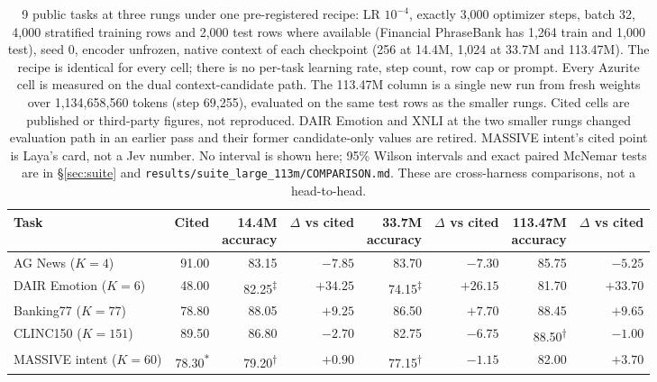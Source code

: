 \begin{table}[htbp]
\centering
\footnotesize
\caption{9 public tasks at three rungs under one pre-registered recipe:
LR $10^{-4}$, exactly 3{,}000 optimizer steps, batch 32, 4{,}000 stratified
training rows and 2{,}000 test rows where available (Financial PhraseBank has
1{,}264 train and 1{,}000 test), seed 0, encoder unfrozen, native context of
each checkpoint (256 at 14.4M, 1{,}024 at 33.7M and 113.47M). The recipe is
identical for every cell; there is no per-task learning rate, step count, row cap
or prompt. Every Azurite cell is measured on the dual context-candidate path. The
113.47M column is a single new run from fresh weights over 1{,}134{,}658{,}560
tokens (step 69{,}255), evaluated on the same test rows as the smaller rungs.
Cited cells are published or third-party figures, not reproduced. DAIR Emotion
and XNLI at the two smaller rungs changed evaluation path in an earlier pass and
their former candidate-only values are retired. MASSIVE intent's cited point is
Laya's card, not a Jev number. No interval is shown here; 95\% Wilson intervals
and exact paired McNemar tests are in \S\ref{sec:suite} and
\texttt{results/suite\_large\_113m/COMPARISON.md}. These are cross-harness
comparisons, not a head-to-head.}
\label{tab:suite}
\setlength{\tabcolsep}{2.5pt}
\begin{tabular}{@{}lrrrrrrr@{}}
\toprule
Task & Cited & \shortstack{14.4M\\accuracy} & \shortstack{$\Delta$ vs\\cited} &
\shortstack{33.7M\\accuracy} & \shortstack{$\Delta$ vs\\cited} &
\shortstack{113.47M\\accuracy} & \shortstack{$\Delta$ vs\\cited} \\
\midrule
AG News ($K=4$) & 91.00 & 83.15 & $-7.85$ & 83.70 & $-7.30$ & 85.75 & $-5.25$ \\
DAIR Emotion ($K=6$) & 48.00 & 82.25\textsuperscript{\(\ddagger\)} & \textbf{$+34.25$} & 74.15\textsuperscript{\(\ddagger\)} & \textbf{$+26.15$} & 81.70 & \textbf{$+33.70$} \\
Banking77 ($K=77$) & 78.80 & 88.05 & \textbf{$+9.25$} & 86.50 & \textbf{$+7.70$} & 88.45 & \textbf{$+9.65$} \\
CLINC150 ($K=151$) & 89.50 & 86.80 & $-2.70$ & 82.75 & $-6.75$ & 88.50\textsuperscript{\(\dagger\)} & $-1.00$ \\
MASSIVE intent ($K=60$) & 78.30\textsuperscript{\(\ast\)} & 79.20\textsuperscript{\(\dagger\)} & $+0.90$ & 77.15\textsuperscript{\(\dagger\)} & $-1.15$ & 82.00 & \textbf{$+3.70$} \\

\end{tabular}
\end{table}
